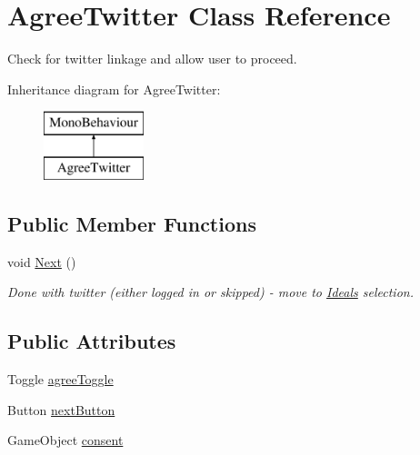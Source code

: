 \hypertarget{class_agree_twitter}{}\section{Agree\+Twitter Class Reference}
\label{class_agree_twitter}


Check for twitter linkage and allow user to proceed.  


Inheritance diagram for Agree\+Twitter\+:\begin{figure}[H]
\begin{center}
\leavevmode
\includegraphics[height=2.000000cm]{class_agree_twitter}
\end{center}
\end{figure}
\subsection*{Public Member Functions}
\begin{DoxyCompactItemize}
\item 
void \mbox{\hyperlink{class_agree_twitter_abeb68444f8f36f2eace07d276ed9970c}{Next}} ()
\begin{DoxyCompactList}\small\item\em Done with twitter (either logged in or skipped) -\/ move to \mbox{\hyperlink{class_ideals}{Ideals}} selection. \end{DoxyCompactList}\end{DoxyCompactItemize}
\subsection*{Public Attributes}
\begin{DoxyCompactItemize}
\item 
Toggle \mbox{\hyperlink{class_agree_twitter_a7fa22a914989a70cf52eb4a0a46cd0c1}{agree\+Toggle}}
\item 
Button \mbox{\hyperlink{class_agree_twitter_ac75bd6520211bb529625d0972bc9f896}{next\+Button}}
\item 
Game\+Object \mbox{\hyperlink{class_agree_twitter_a88d8132a44edc46d16598ac3cf431f94}{consent}}
\end{DoxyCompactItemize}
